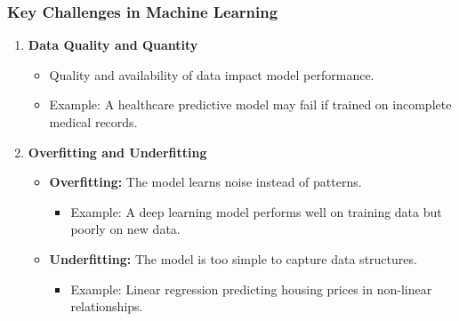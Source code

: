 \documentclass{beamer}
\begin{document}
\begin{frame}[fragile]
    \frametitle{Key Challenges in Machine Learning}

    \begin{enumerate}
        \item \textbf{Data Quality and Quantity}
        \begin{itemize}
            \item Quality and availability of data impact model performance.
            \item Example: A healthcare predictive model may fail if trained on incomplete medical records.
        \end{itemize}
        
        \item \textbf{Overfitting and Underfitting}
        \begin{itemize}
            \item \textbf{Overfitting:} The model learns noise instead of patterns.
            \begin{itemize}
                \item Example: A deep learning model performs well on training data but poorly on new data.
            \end{itemize}
            \item \textbf{Underfitting:} The model is too simple to capture data structures.
            \begin{itemize}
                \item Example: Linear regression predicting housing prices in non-linear relationships.
            \end{itemize}
        \end{itemize}
    \end{enumerate}
\end{frame}
\end{document}
